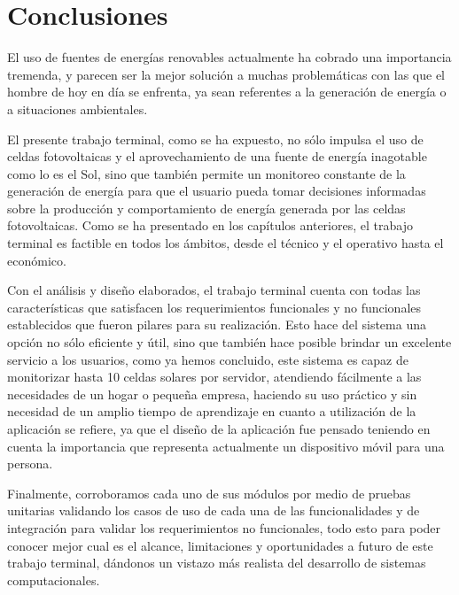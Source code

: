 \chapter{Conclusiones}\label{chapter6}
El uso de fuentes de energías renovables actualmente ha cobrado una importancia tremenda, y parecen ser la mejor solución a muchas problemáticas con las que el hombre de hoy en día se enfrenta, ya sean referentes a la generación de energía o a situaciones ambientales.

\newline El presente trabajo terminal, como se ha expuesto, no sólo impulsa el uso de celdas fotovoltaicas y el aprovechamiento de una fuente de energía inagotable como lo es el Sol, sino que también permite un monitoreo constante de la generación de energía para que el usuario pueda tomar decisiones informadas sobre la producción y comportamiento de energía generada por las celdas fotovoltaicas. Como se ha presentado en los capítulos anteriores, el trabajo terminal es factible en todos los ámbitos, desde el técnico y el operativo hasta el económico.

\newline Con el análisis y diseño elaborados, el trabajo terminal cuenta con todas las características que satisfacen los requerimientos funcionales y no funcionales establecidos que fueron pilares para su realización. Esto hace del sistema una opción no sólo eficiente y útil, sino que también hace posible brindar un excelente servicio a los usuarios, como ya hemos concluido, este sistema es capaz de monitorizar hasta 10 celdas solares por servidor, atendiendo fácilmente a las necesidades de un hogar o pequeña empresa, haciendo su uso práctico y sin necesidad de un amplio tiempo de aprendizaje en cuanto a utilización de la aplicación se refiere, ya que el diseño de la aplicación fue pensado teniendo en cuenta la importancia que representa actualmente un dispositivo móvil para una persona.

\newline Finalmente, corroboramos cada uno de sus módulos por medio de pruebas unitarias validando los casos de uso de cada una de las funcionalidades y de integración para validar los requerimientos no funcionales, todo esto para poder conocer mejor cual es el alcance, limitaciones y oportunidades a futuro de este trabajo terminal, dándonos un vistazo más realista del desarrollo de sistemas computacionales.
